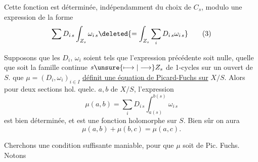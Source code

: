 Cette fonction est déterminée, indépendamment du choix de $C_s$, modulo une expression de la forme
\[
 \sum D_{i\,s}\int_{Z_s}\omega_{i\,s}
 \deleted{=\int_{Z_s}\sum_i D_{i\,s}\omega_{i\,s}}
 \tag*{(3)}
\]


Supposons que les $D_i$, $\omega_i$ soient tels que l'expression précédente soit nulle, quelle que soit  la famille continue $s\unsure{\longmapsto|\longrightarrow}Z_s$ de 1-cycles sur un ouvert de $S$.    que  $\mu=(D_i,\omega_i)_{i\in I}$ \uline{définit une équation de Picard-Fuchs sur} $X/S$. Alors pour deux sections hol. quelc. $a,b$ de $X/S$, l'expression
\[
 \mu(a,b)=\sum_i D_{i\,s}\int_{a(s)}^{b(s)}\omega_{i\,s}
 \tag*{(4}
\]
est bien déterminée, et est une fonction holomorphe sur $S$. Bien sûr on aura
\[
 \mu(a,b)+\mu(b,c)=\mu(a,c).\tag*{(5)}
\]

Cherchons une condition suffisante maniable,    pour que $\mu$ soit de Pic. Fuchs. Notons
